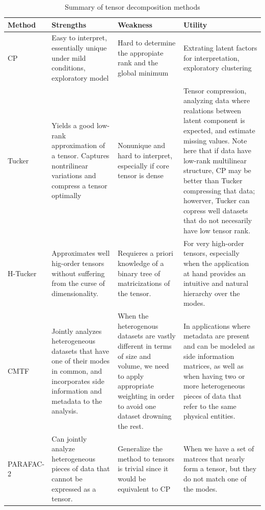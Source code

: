 \documentclass[letterpaper,12pt]{article}
\begin{document}
 \begin{table}[!ht]
  \centering
  \begin{tabular}{|l|p{3cm}|p{3cm}|p{7cm}|}
  \hline
   Method & Strengths & Weakness & Utility\\
   \hline
   CP & Easy to interpret, essentially unique under mild conditions, exploratory model & Hard to determine the appropiate rank and the global minimum & Extrating latent factors for interpretation, exploratory clustering\\
   \hline
Tucker & Yields a good low-rank approximation of a tensor. Captures nontrilinear variations and compress a tensor optimally & Nonunique and hard to interpret, especially if core tensor is dense & Tensor compression, analyzing data where realations between latent component is expected, and estimate missing values. Note here that if data have low-rank multilinear structure, CP may be better than Tucker compressing that data; howerver, Tucker can copress well datasets that do not necesarily have low tensor rank.\\
\hline
H-Tucker & Approximates well hig-order tensors without suffering from the curse of dimensionality. & Requieres a priori knowledge of a binary tree of matricizations of the tensor. & For very high-order tensors, especially when the application at hand provides an intuitive and natural hierarchy over the modes.\\
\hline
CMTF & Jointly analyzes heterogeneous datasets that have one of their modes in common, and incorporates side information and metadata to the analysis. & When the heterogenous datasets are vastly different in terms of size and volume, we need to apply appropriate weighting in order to avoid one dataset drowning the rest. & In applications where metadata are present and can be modeled as side information matrices, as well as when having two or more heterogeneous pieces of data that refer to the same physical entities.\\
\hline
PARAFAC-2 & Can jointly analyze heterogeneous pieces of data that cannot be expressed as a tensor. & Generalize the method to tensors is trivial since it would be equivalent to CP & When we have a set of matrces that nearly form a tensor, but they do not match one of the modes.\\
\hline
  \end{tabular}
\caption{Summary of tensor decomposition methods}\label{tb:summary_methods}
 \end{table}

 
 
\end{document}

